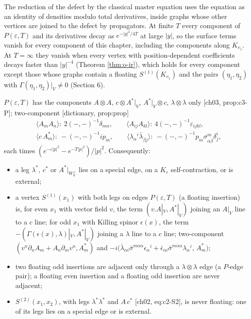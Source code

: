 The reduction of the defect by the classical master equation uses the equation as an identity of densities modulo total derivatives, inside graphs whose other vertices are joined to the defect by propagators. At finite $T$ every component of $P(\varepsilon,T)$ and its derivatives decay as $e^{-|y|^2/4T}$ at large $|y|$, so the surface terms vanish for every component of this chapter, including the components along $K_{v_1}$. At $T=\infty$ they vanish when every vertex with position-dependent coefficients decays faster than $|y|^{-4}$ (Theorem \ref{thm:o-ir}), which holds for every component except those whose graphs contain a floating $S^{(1)}(K_{v_1})$ and the pairs $(\eta_1,\eta_2)$ with $\Gamma(\eta_1,\eta_2)|_V\neq0$ (Section 6).

\begin{lemma}
\label{lem:o-legs}
$P(\varepsilon,T)$ has the components $A\otimes A$, $c\otimes A^*|_V$, $A^*|_V\otimes c$, $\lambda\otimes\lambda$ only [ch03, prop:c3-P]; two-component [dictionary, prop:prop]
\[
\begin{aligned}
&\langle A_mA_n\rangle:\ 2(-,-)^{-1}\delta_{mn},\qquad \langle A_{ij}A_{kl}\rangle:\ 4(-,-)^{-1}\varepsilon_{ijkl},\\
&\langle c\,A^*_m\rangle:\ -(-,-)^{-1}ip_m,\qquad \langle\lambda_\alpha{}^i\bar\lambda_{\dot\beta j}\rangle:\ -(-,-)^{-1}p_m\sigma^m_{\alpha\dot\beta}\delta^i_j ,
\end{aligned}
\]
each times $(e^{-\varepsilon|p|^2}-e^{-T|p|^2})/|p|^2$. Consequently:
\begin{itemize}
\item a leg $\lambda^*$, $c^*$ or $A^*|_{W_{\mathbb R}^\perp}$ lies on a special edge, on a $K_\varepsilon$ self-contraction, or is external;
\item a vertex $S^{(1)}(x_1)$ with both legs on edges $P(\varepsilon,T)$ (a floating insertion) is, for even $x_1$ with vector field $v$, the term $(v.A|_V,A^*|_V)$ joining an $A|_V$ line to a $c$ line; for odd $x_1$ with Killing spinor $\epsilon(x)$, the term $-(\Gamma(\epsilon(x),\lambda)|_V,A^*|_V)$ joining a $\lambda$ line to a $c$ line; two-component $(v^n\partial_nA_m+A_n\partial_mv^n,A^*_m)$ and $-i\big(\bar\lambda_{\dot\alpha i}\bar\sigma^{m\dot\alpha\alpha}\epsilon_\alpha{}^i+\bar\epsilon_{\dot\alpha i}\bar\sigma^{m\dot\alpha\alpha}\lambda_\alpha{}^i,\,A^*_m\big)$;
\item two floating odd insertions are adjacent only through a $\lambda\otimes\lambda$ edge (a $P$-edge pair); a floating even insertion and a floating odd insertion are never adjacent;
\item $S^{(2)}(x_1,x_2)$, with legs $\lambda^*\lambda^*$ and $A\,c^*$ [ch02, eq:c2-S2], is never floating: one of its legs lies on a special edge or is external.
\end{itemize}
\end{lemma}

